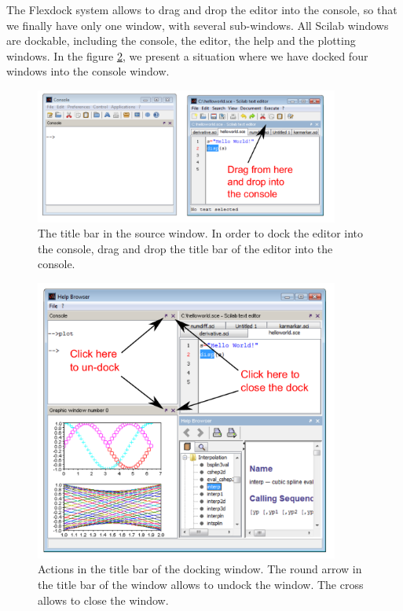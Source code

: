 The Flexdock system allows to drag and drop the editor into the console, so that we finally have only one 
window, with several sub-windows. All Scilab windows are dockable, including
the console, the editor, the help and the plotting windows. In the figure 
\ref{fig-scilab-consoleundock}, we present a situation where we have docked 
four windows into the console window.

\begin{figure}
\begin{center}
\includegraphics[width=10cm]{introscilab/console-dock.pdf}
\end{center}
\caption{The title bar in the source window. In order to dock the editor into the 
console, drag and drop the title bar of the editor into the console.}
\label{fig-scilab-consoledock}
\end{figure}

\begin{figure}
\begin{center}
\includegraphics[width=10cm]{introscilab/console-undock.pdf}
\end{center}
\caption{Actions in the title bar of the docking window. The round arrow in the 
title bar of the window allows to undock the window. The cross allows to 
close the window.}
\label{fig-scilab-consoleundock}
\end{figure}

